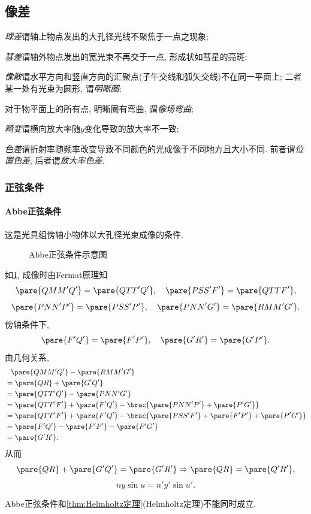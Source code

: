 \documentclass{ctexart}
\begin{document}

\subsection{像差} %
\label{sub:像差}

\begin{cenum}
    \item \emph{球差}谓轴上物点发出的大孔径光线不聚焦于一点之现象;
    \item \emph{彗差}谓轴外物点发出的宽光束不再交于一点, 形成状如彗星的亮斑;
    \item \emph{像散}谓水平方向和竖直方向的汇聚点(子午交线和弧矢交线)不在同一平面上; 二者某一处有光束为圆形, 谓\emph{明晰圈};
    \item 对于物平面上的所有点, 明晰圈有弯曲, 谓\emph{像场弯曲};
    \item \emph{畸变}谓横向放大率随$y$变化导致的放大率不一致;
    \item \emph{色差}谓折射率随频率改变导致不同颜色的光成像于不同地方且大小不同. 前者谓\emph{位置色差}, 后者谓\emph{放大率色差}.
\end{cenum}

\subsubsection{正弦条件} %
\label{ssub:正弦条件}

\paragraph{Abbe正弦条件} %
\label{par:abbe正弦条件}

这是光具组傍轴小物体以大孔径光束成像的条件.
\begin{figure}[ht]
    \centering
    \caption{Abbe正弦条件示意图}
    \label{fig:abbe正弦条件示意图}
\end{figure}
如\cref{fig:abbe正弦条件示意图}, 成像时由Fermat原理知
\[ \pare{QMM'Q'} = \pare{QTT'Q'}, \quad \pare{PSS'F'} = \pare{QTTF'}, \]
\[ \pare{PNN'P'} = \pare{PSS'P'},\quad \pare{PNN'G'} = \pare{RMM'G'}. \]
傍轴条件下,
\[ \pare{F'Q'} = \pare{F'P'},\quad \pare{G'R'} = \pare{G'P'}. \]
由几何关系,
\begin{align*}
    & \phantom{ = } \pare{QMM'Q'} - \pare{RMM'G'}\\
    &= \pare{QR} + \pare{G'Q'} \\
    &= \pare{QTT'Q'} - \pare{PNN'G'} \\
    &= \pare{QTT'F'} + \pare{F'Q'} - \brac{\pare{PNN'P'} + \pare{P'G'}} \\
    &= \pare{QTT'F'} + \pare{F'Q'} - \brac{\pare{PSS'F'} + \pare{F'P'} + \pare{P'G'}} \\
    &= \pare{F'Q'} - \pare{F'P'} - \pare{P'G'}\\
    &= \pare{G'R'}.
\end{align*}
从而
\[ \pare{QR} + \pare{G'Q'} = \pare{G'R'}\Rightarrow \pare{QR} = \pare{Q'R'}, \]
\[ ny\sin u = n'y'\sin u'. \]
\begin{remark}
    Abbe正弦条件和\cref{thm:Helmholtz定理}(Helmholtz定理)不能同时成立.
\end{remark}
\end{document}
